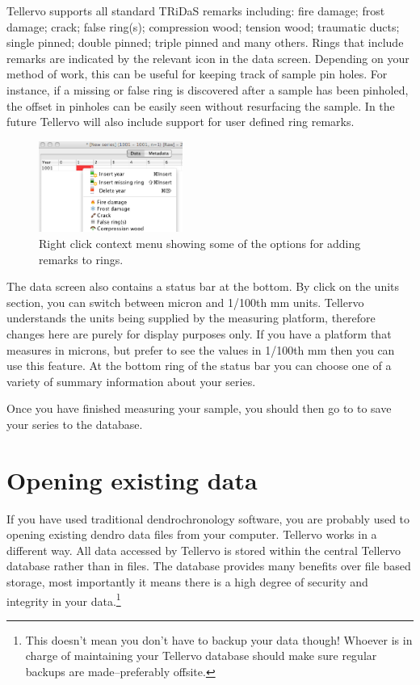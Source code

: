 Tellervo supports all standard TRiDaS remarks including: fire damage; frost damage; crack; false ring(s); compression wood; tension wood; traumatic ducts; single pinned; double pinned; triple pinned and many others.  Rings that include remarks are indicated by the relevant icon in the data screen.  Depending on your method of work, this can be useful for keeping track of sample pin holes.  For instance, if a missing or false ring is discovered after a sample has been pinholed, the offset in pinholes can be easily seen without resurfacing the sample.  In the future Tellervo will also include support for user defined ring remarks.  

\begin{figure}
  \begin{center}
    \includegraphics[width=0.42\textwidth]{Images/ringremarks.png}
  \end{center}
  \caption{Right click context menu showing some of the options for adding remarks to rings.}
  \label{fig:ringremarks}
\end{figure}

The data screen also contains a status bar at the bottom. By click on the units section, you can switch between micron and 1/100th mm units. Tellervo understands the units being supplied by the measuring platform, therefore changes here are purely for display purposes only. If you have a platform that measures in microns, but prefer to see the values in 1/100th mm then you can use this feature. At the bottom ring of the status bar you can choose one of a variety of summary information about your series.

Once you have finished measuring your sample, you should then go to  to save your series to the database. 


\section{Opening existing data}
If you have used traditional dendrochronology software, you are probably used to opening existing dendro data files from your computer.  Tellervo works in a different way.  All data accessed by Tellervo is stored within the central Tellervo database rather than in files.  The database provides many benefits over file based storage, most importantly it means there is a high degree of security and integrity in your data.\footnote{This doesn't mean you don't have to backup your data though!  Whoever is in charge of maintaining your Tellervo database should make sure regular backups are made--preferably offsite.}

